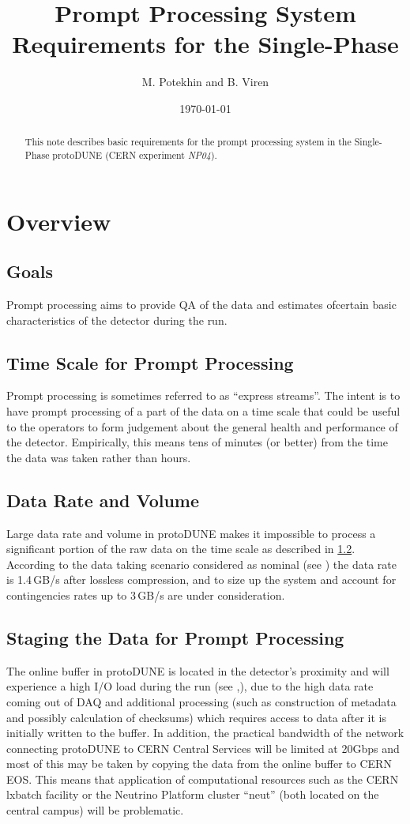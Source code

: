 \documentclass[pdftex,12pt,letter]{article}
\title{Prompt Processing System Requirements for the Single-Phase \pd}
\date{\today}
\author{M. Potekhin and B. Viren}
\newcommand{\pd}{protoDUNE\xspace}
\newcommand{\expname}{\textit{NP04}\xspace}
\begin{document}
\maketitle

\begin{abstract}
\noindent  This note describes basic requirements for the prompt processing system in the Single-Phase \pd
(CERN experiment \expname).
\end{abstract}

\section{Overview}
\subsection{Goals}
\label{sec:goals}
Prompt processing aims to provide QA of the data and estimates ofcertain  basic characteristics of the detector during the run.


\subsection{Time Scale for Prompt Processing}
\label{sec:timescale}
 Prompt processing is sometimes referred to as ``express streams''.
The intent is to have prompt processing of a part of the data on a time scale that could be useful to the operators to
form judgement about the general health and performance of the detector.
Empirically, this means tens of minutes (or better) from the time the data was taken rather than hours.

\subsection{Data Rate and Volume}
\label{sec:datavolume}
Large data rate and volume in \pd makes it impossible to process a significant portion of the raw data on the time scale as described in \ref{sec:timescale}.
According to the data taking scenario considered as nominal (see \cite{docdb1086}) the data rate is 1.4\,GB/s after lossless compression, and to size up
the system and account for contingencies rates up to 3\,GB/s are under consideration.

\subsection{Staging the Data for Prompt Processing}
\label{sec:datalocation}
The online buffer in \pd is located in the detector's proximity and will experience a high I/O load during the run (see \cite{docdb1086},\cite{docdb1212}), due
to the high data rate coming out of DAQ and additional processing (such as construction of metadata and possibly calculation of checksums) which requires
access to data after it is initially written to the buffer. In addition, the practical bandwidth of the network connecting \pd to CERN Central Services will be limited at 20Gbps
and most of this may be taken by copying the data from the online buffer to CERN EOS. This means that application of computational resources such as the
CERN lxbatch facility or the Neutrino Platform cluster ``neut'' (both located on the central campus) will be problematic.
\end{document}
